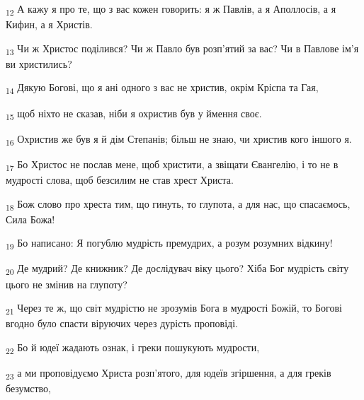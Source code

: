 \begin{tcolorbox}
\textsubscript{12} А кажу я про те, що з вас кожен говорить: я ж Павлів, а я Аполлосів, а я Кифин, а я Христів.
\end{tcolorbox}
\begin{tcolorbox}
\textsubscript{13} Чи ж Христос поділився? Чи ж Павло був розп'ятий за вас? Чи в Павлове ім'я ви христились?
\end{tcolorbox}
\begin{tcolorbox}
\textsubscript{14} Дякую Богові, що я ані одного з вас не христив, окрім Кріспа та Гая,
\end{tcolorbox}
\begin{tcolorbox}
\textsubscript{15} щоб ніхто не сказав, ніби я охристив був у ймення своє.
\end{tcolorbox}
\begin{tcolorbox}
\textsubscript{16} Охристив же був я й дім Степанів; більш не знаю, чи христив кого іншого я.
\end{tcolorbox}
\begin{tcolorbox}
\textsubscript{17} Бо Христос не послав мене, щоб христити, а звіщати Євангелію, і то не в мудрості слова, щоб безсилим не став хрест Христа.
\end{tcolorbox}
\begin{tcolorbox}
\textsubscript{18} Бож слово про хреста тим, що гинуть, то глупота, а для нас, що спасаємось, Сила Божа!
\end{tcolorbox}
\begin{tcolorbox}
\textsubscript{19} Бо написано: Я погублю мудрість премудрих, а розум розумних відкину!
\end{tcolorbox}
\begin{tcolorbox}
\textsubscript{20} Де мудрий? Де книжник? Де дослідувач віку цього? Хіба Бог мудрість світу цього не змінив на глупоту?
\end{tcolorbox}
\begin{tcolorbox}
\textsubscript{21} Через те ж, що світ мудрістю не зрозумів Бога в мудрості Божій, то Богові вгодно було спасти віруючих через дурість проповіді.
\end{tcolorbox}
\begin{tcolorbox}
\textsubscript{22} Бо й юдеї жадають ознак, і греки пошукують мудрости,
\end{tcolorbox}
\begin{tcolorbox}
\textsubscript{23} а ми проповідуємо Христа розп'ятого, для юдеїв згіршення, а для греків безумство,
\end{tcolorbox}
